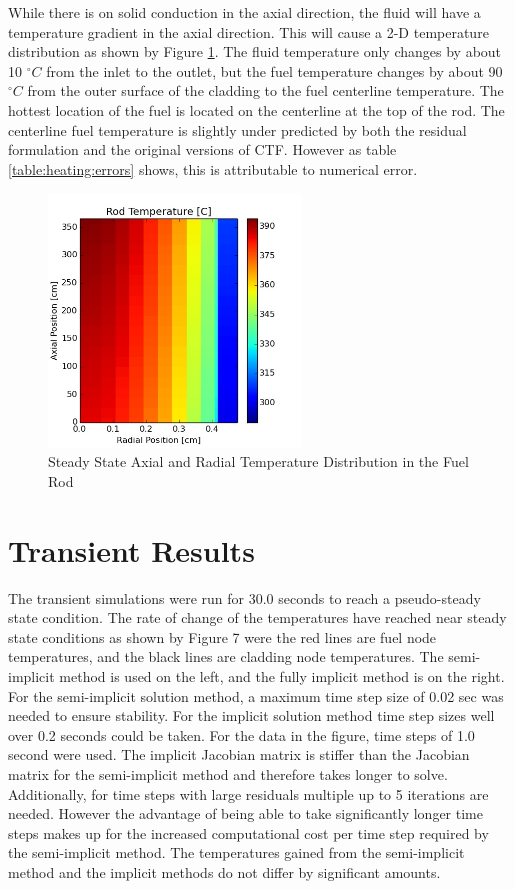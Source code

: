 While there is on solid conduction in the axial direction, the fluid will have a
temperature gradient in the axial direction. This will cause a 2-D temperature
distribution as shown by Figure \ref{fig:Rod_Profile}. The fluid temperature
only changes by about 10 $^{\circ}C$ from the inlet to the outlet, but the fuel
temperature changes by about 90 $^{\circ}C$ from the outer surface of the
cladding to the fuel centerline temperature. The hottest location of the fuel
is located on the centerline at the top of the rod. The centerline fuel
temperature is slightly under predicted by both the residual formulation and
the original versions of CTF. However as table \ref{table:heating:errors}
shows, this is attributable to numerical error.

\begin{figure}[!h]
	\centering
	\includegraphics[width=0.60\textwidth]{images/rod_profile.jpg}
	\caption{Steady State Axial and Radial Temperature Distribution in the Fuel Rod}
	\label{fig:Rod_Profile}
\end{figure}


\section{Transient Results}

The transient simulations were run for 30.0 seconds to reach a pseudo-steady
state condition. The rate of change of the temperatures have reached near steady
state conditions as shown by Figure 7 were the red lines are fuel node
temperatures, and the black lines are cladding node temperatures. The
semi-implicit method is used on the left, and the fully implicit method is on
the right. For the semi-implicit solution method, a maximum time step size of
0.02 sec was needed to ensure stability. For the implicit solution method time
step sizes well over 0.2 seconds could be taken. For the data in the figure,
time steps of 1.0 second were used. The implicit Jacobian matrix is stiffer than
the Jacobian matrix for the semi-implicit method and therefore takes longer to
solve. Additionally, for time steps with large residuals multiple up to 5
iterations are needed. However the advantage of being able to take significantly
longer time steps makes up for the increased computational cost per time step
required by the semi-implicit method. The temperatures gained from the
semi-implicit method and the implicit methods do not differ by significant
amounts.

